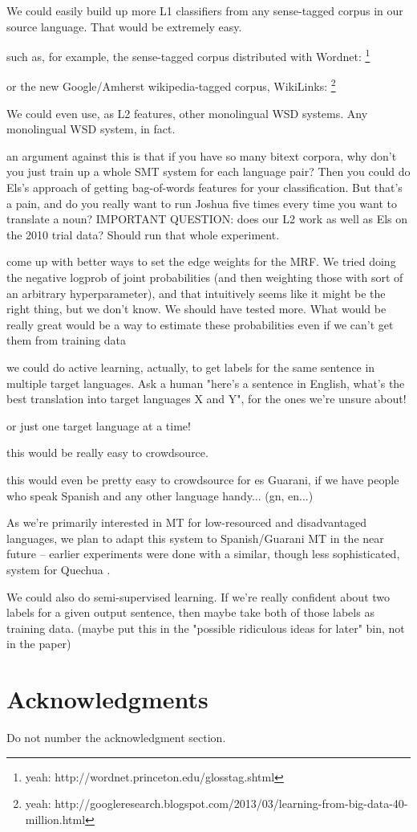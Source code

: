 \documentclass[11pt,letterpaper]{article}
\begin{document}
We could easily build up more L1 classifiers from any sense-tagged corpus in
our source language. That would be extremely easy.

such as, for example, the sense-tagged corpus distributed with Wordnet:
\footnote{yeah: http://wordnet.princeton.edu/glosstag.shtml}

or the new Google/Amherst wikipedia-tagged corpus, WikiLinks:
\footnote{yeah: http://googleresearch.blogspot.com/2013/03/learning-from-big-data-40-million.html}

We could even use, as L2 features, other monolingual WSD systems. Any
monolingual WSD system, in fact.


an argument against this is that if you have so many bitext corpora, why
don't you just train up a whole SMT system for each language pair? Then you
could do Els's approach of getting bag-of-words features for your
classification. But that's a pain, and do you really want to run Joshua five
times every time you want to translate a noun? IMPORTANT QUESTION: does our L2
work as well as Els on the 2010 trial data? Should run that whole experiment.


come up with better ways to set the edge weights for the MRF. We tried doing
the negative logprob of joint probabilities (and then weighting those with
sort of an arbitrary hyperparameter), and that intuitively seems like it might
be the right thing, but we don't know. We should have tested more. What would
be really great would be a way to estimate these probabilities even if we
can't get them from training data

we could do active learning, actually, to get labels for the same sentence
in multiple target languages. Ask a human "here's a sentence in English, what's
the best translation into target languages X and Y", for the ones we're unsure
about!

or just one target language at a time!

this would be really easy to crowdsource.

this would even be pretty easy to crowdsource for es Guarani, if we have
people who speak Spanish and any other language handy... (gn, en...)

As we're primarily interested in MT for low-resourced and disadvantaged
languages, we plan to adapt this system to Spanish/Guarani MT in the near
future -- earlier experiments were done with a similar, though less
sophisticated, system for Quechua \cite{rudnick:2011:RANLPStud}.

We could also do semi-supervised learning. If we're really confident about
two labels for a given output sentence, then maybe take both of those labels as
training data. (maybe put this in the "possible ridiculous ideas for later"
bin, not in the paper)



\section*{Acknowledgments}

Do not number the acknowledgment section.


{}
\end{document}
